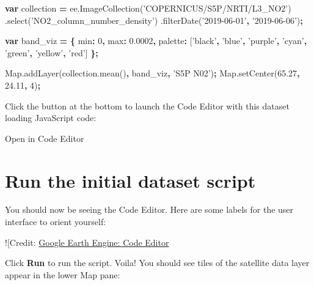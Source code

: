 \documentclass[]{book}
\newenvironment{Shaded}{\begin{snugshade}}{\end{snugshade}}
\newcommand{\AttributeTok}[1]{\textcolor[rgb]{0.77,0.63,0.00}{#1}}
\newcommand{\DataTypeTok}[1]{\textcolor[rgb]{0.13,0.29,0.53}{#1}}
\newcommand{\DecValTok}[1]{\textcolor[rgb]{0.00,0.00,0.81}{#1}}
\newcommand{\FloatTok}[1]{\textcolor[rgb]{0.00,0.00,0.81}{#1}}
\newcommand{\KeywordTok}[1]{\textcolor[rgb]{0.13,0.29,0.53}{\textbf{#1}}}
\newcommand{\NormalTok}[1]{#1}
\newcommand{\OperatorTok}[1]{\textcolor[rgb]{0.81,0.36,0.00}{\textbf{#1}}}
\newcommand{\StringTok}[1]{\textcolor[rgb]{0.31,0.60,0.02}{#1}}
\newcommand{\VariableTok}[1]{\textcolor[rgb]{0.00,0.00,0.00}{#1}}
\begin{document}
\begin{Shaded}
\begin{Highlighting}[]
\KeywordTok{var}\NormalTok{ collection }\OperatorTok{=} \VariableTok{ee}\NormalTok{.}\AttributeTok{ImageCollection}\NormalTok{(}\StringTok{'COPERNICUS/S5P/NRTI/L3_NO2'}\NormalTok{)}
\NormalTok{  .}\AttributeTok{select}\NormalTok{(}\StringTok{'NO2_column_number_density'}\NormalTok{)}
\NormalTok{  .}\AttributeTok{filterDate}\NormalTok{(}\StringTok{'2019-06-01'}\OperatorTok{,} \StringTok{'2019-06-06'}\NormalTok{)}\OperatorTok{;}

\KeywordTok{var}\NormalTok{ band_viz }\OperatorTok{=} \OperatorTok{\{}
  \DataTypeTok{min}\OperatorTok{:} \DecValTok{0}\OperatorTok{,}
  \DataTypeTok{max}\OperatorTok{:} \FloatTok{0.0002}\OperatorTok{,}
  \DataTypeTok{palette}\OperatorTok{:}\NormalTok{ [}\StringTok{'black'}\OperatorTok{,} \StringTok{'blue'}\OperatorTok{,} \StringTok{'purple'}\OperatorTok{,} \StringTok{'cyan'}\OperatorTok{,} \StringTok{'green'}\OperatorTok{,} \StringTok{'yellow'}\OperatorTok{,} \StringTok{'red'}\NormalTok{]}
\OperatorTok{\};}

\VariableTok{Map}\NormalTok{.}\AttributeTok{addLayer}\NormalTok{(}\VariableTok{collection}\NormalTok{.}\AttributeTok{mean}\NormalTok{()}\OperatorTok{,}\NormalTok{ band_viz}\OperatorTok{,} \StringTok{'S5P N02'}\NormalTok{)}\OperatorTok{;}
\VariableTok{Map}\NormalTok{.}\AttributeTok{setCenter}\NormalTok{(}\FloatTok{65.27}\OperatorTok{,} \FloatTok{24.11}\OperatorTok{,} \DecValTok{4}\NormalTok{)}\OperatorTok{;}
\end{Highlighting}
\end{Shaded}

Click the button at the bottom to launch the Code Editor with this dataset loading JavaScript code:

Open in Code Editor

\hypertarget{run-the-initial-dataset-script}{%
\section{Run the initial dataset script}\label{run-the-initial-dataset-script}}

You should now be seeing the Code Editor. Here are some labels for the user interface to orient yourself:

!{[}Credit: \href{images/gee_02_codeeditor.png}{Google Earth Engine: Code Editor}

Click \textbf{Run} to run the script. Voila! You should see tiles of the satellite data layer appear in the lower Map pane:
\end{document}
